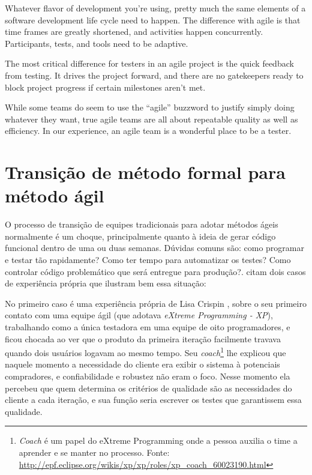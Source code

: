 \documentclass[
	12pt,				%
	openright,			%
	oneside,			%
	a4paper,			%
	english,			%
	brazil,				%
	]{abntex2}
\begin{document}
Whatever flavor of development you’re using, pretty much the same elements of a software development life cycle need to happen. The difference with agile is that time frames are greatly shortened, and activities happen concurrently. Participants, tests, and tools need to be adaptive.

The most critical difference for testers in an agile project is the quick feedback from testing. It drives the project forward, and there are no gatekeepers ready to block project progress if certain milestones aren’t met.

While some teams do seem to use the “agile” buzzword to justify simply doing whatever they want, true agile teams are all about repeatable quality as well as efficiency. In our experience, an agile team is a wonderful place to be a tester.

\section{Transição de método formal para método ágil}

O processo de transição de equipes tradicionais para adotar métodos ágeis normalmente é um choque, principalmente quanto à ideia de gerar código funcional dentro de uma ou duas semanas. Dúvidas comuns são: como programar e testar tão rapidamente? Como ter tempo para automatizar os testes? Como controlar código problemático que será entregue para produção?. \cite{crispin2009} citam dois casos de experiência própria que ilustram bem essa situação:

No primeiro caso é uma experiência própria de Lisa Crispin \cite{crispin2009}, sobre o seu primeiro contato com uma equipe ágil (que adotava \emph{eXtreme Programming - XP}), trabalhando como a única testadora em uma equipe de oito programadores, e ficou chocada ao ver que o produto da primeira iteração facilmente travava quando dois usuários logavam ao mesmo tempo. Seu \emph{coach}\footnote{\emph{Coach} é um papel do eXtreme Programming onde a pessoa auxilia o time a aprender e se manter no processo. Fonte: \url{ http://epf.eclipse.org/wikis/xp/xp/roles/xp_coach_60023190.html}} lhe explicou que naquele momento a necessidade do cliente era exibir o sistema à potenciais compradores, e confiabilidade e robustez não eram o foco. Nesse momento ela percebeu que quem determina os critérios de qualidade são as necessidades do cliente a cada iteração, e sua função seria escrever os testes que garantissem essa qualidade.
\end{document}
